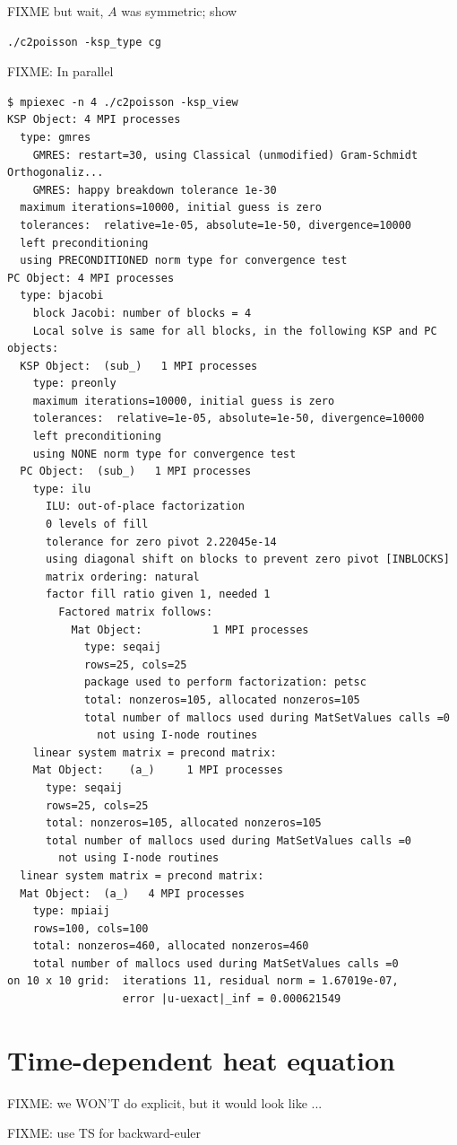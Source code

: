 FIXME but wait, $A$ was symmetric; show
\begin{Verbatim}[fontsize=\small]
./c2poisson -ksp_type cg
\end{Verbatim}

FIXME:  In parallel
\begin{Verbatim}[fontsize=\small]
$ mpiexec -n 4 ./c2poisson -ksp_view
KSP Object: 4 MPI processes
  type: gmres
    GMRES: restart=30, using Classical (unmodified) Gram-Schmidt Orthogonaliz...
    GMRES: happy breakdown tolerance 1e-30
  maximum iterations=10000, initial guess is zero
  tolerances:  relative=1e-05, absolute=1e-50, divergence=10000
  left preconditioning
  using PRECONDITIONED norm type for convergence test
PC Object: 4 MPI processes
  type: bjacobi
    block Jacobi: number of blocks = 4
    Local solve is same for all blocks, in the following KSP and PC objects:
  KSP Object:  (sub_)   1 MPI processes
    type: preonly
    maximum iterations=10000, initial guess is zero
    tolerances:  relative=1e-05, absolute=1e-50, divergence=10000
    left preconditioning
    using NONE norm type for convergence test
  PC Object:  (sub_)   1 MPI processes
    type: ilu
      ILU: out-of-place factorization
      0 levels of fill
      tolerance for zero pivot 2.22045e-14
      using diagonal shift on blocks to prevent zero pivot [INBLOCKS]
      matrix ordering: natural
      factor fill ratio given 1, needed 1
        Factored matrix follows:
          Mat Object:           1 MPI processes
            type: seqaij
            rows=25, cols=25
            package used to perform factorization: petsc
            total: nonzeros=105, allocated nonzeros=105
            total number of mallocs used during MatSetValues calls =0
              not using I-node routines
    linear system matrix = precond matrix:
    Mat Object:    (a_)     1 MPI processes
      type: seqaij
      rows=25, cols=25
      total: nonzeros=105, allocated nonzeros=105
      total number of mallocs used during MatSetValues calls =0
        not using I-node routines
  linear system matrix = precond matrix:
  Mat Object:  (a_)   4 MPI processes
    type: mpiaij
    rows=100, cols=100
    total: nonzeros=460, allocated nonzeros=460
    total number of mallocs used during MatSetValues calls =0
on 10 x 10 grid:  iterations 11, residual norm = 1.67019e-07,
                  error |u-uexact|_inf = 0.000621549
\end{Verbatim}



\section{Time-dependent heat equation}

FIXME: we WON'T do explicit, but it would look like ...

FIXME: use TS for backward-euler
